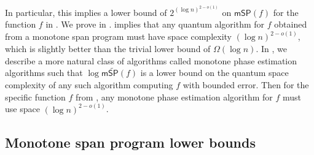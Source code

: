 \documentclass[11pt]{article}
\numberwithin{equation}{section}
\theoremstyle{definition}
\theoremstyle{plain}
\begin{document}
In particular, this implies a lower bound of $2^{(\log n)^{2-o(1)}}$ on $\mathsf{mSP}(f)$ for the function $f$ in . 
We prove  in . 
 implies that any quantum algorithm for $f$ obtained from a monotone span program must have space complexity $(\log n)^{2-o(1)}$, which is slightly better than the trivial lower bound of $\Omega(\log n)$. In , we describe a more natural class of algorithms called monotone phase estimation algorithms such that $\log\mathsf{m}\widetilde{\mathsf{SP}}(f)$ is a lower bound on the quantum space complexity of any such algorithm computing $f$ with bounded error. Then for the specific function $f$ from , any monotone phase estimation algorithm for $f$ must use space $(\log n)^{2-o(1)}$. 



\subsection{Monotone span program lower bounds}\label{sec:monotone-lower-bounds}
\end{document}
